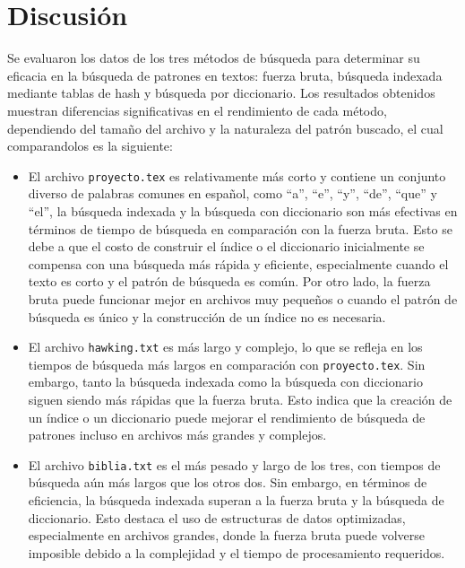 \documentclass[12pt, twoside]{article}
\begin{document}
\section{Discusión}
Se evaluaron los datos de los tres métodos de búsqueda para determinar su eficacia en la búsqueda de patrones en textos: fuerza bruta, búsqueda indexada mediante tablas de hash y búsqueda por diccionario. Los resultados obtenidos muestran diferencias significativas en el rendimiento de cada método, dependiendo del tamaño del archivo y la naturaleza del patrón buscado, el cual comparandolos es la siguiente:
\begin{itemize}
            \item El archivo \texttt{proyecto.tex} es relativamente más corto y contiene un conjunto diverso de palabras comunes en español, como ``a'', ``e'', ``y'', ``de'', ``que'' y ``el'', la búsqueda indexada y la búsqueda con diccionario son más efectivas en términos de tiempo de búsqueda en comparación con la fuerza bruta. Esto se debe a que el costo de construir el índice o el diccionario inicialmente se compensa con una búsqueda más rápida y eficiente, especialmente cuando el texto es corto y el patrón de búsqueda es común. Por otro lado, la fuerza bruta puede funcionar mejor en archivos muy pequeños o cuando el patrón de búsqueda es único y la construcción de un índice no es necesaria.
            
            \item El archivo \texttt{hawking.txt} es más largo y complejo, lo que se refleja en los tiempos de búsqueda más largos en comparación con \texttt{proyecto.tex}. Sin embargo, tanto la búsqueda indexada como la búsqueda con diccionario siguen siendo más rápidas que la fuerza bruta. Esto indica que la creación de un índice o un diccionario puede mejorar el rendimiento de búsqueda de patrones incluso en archivos más grandes y complejos.

            \item El archivo \texttt{biblia.txt} es el más pesado y largo de los tres, con tiempos de búsqueda aún más largos que los otros dos. Sin embargo, en términos de eficiencia, la búsqueda indexada superan a la fuerza bruta y la búsqueda de diccionario. Esto destaca el uso de estructuras de datos optimizadas, especialmente en archivos grandes, donde la fuerza bruta puede volverse imposible debido a la complejidad y el tiempo de procesamiento requeridos.
        \end{itemize}
\end{document}
